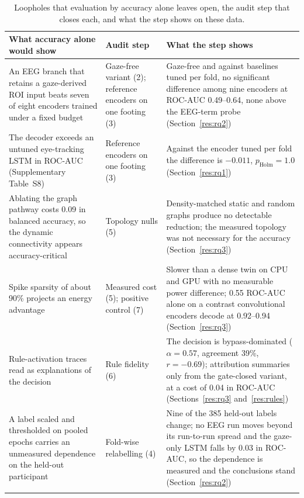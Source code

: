 \documentclass[pdflatex,sn-basic,Numbered,twocolumn,iicol]{sn-jnl}
\theoremstyle{thmstyleone}%
\theoremstyle{thmstyletwo}%
\theoremstyle{thmstylethree}%
\begin{document}
\begin{table}[!htbp]
\caption{Loopholes that evaluation by accuracy alone leaves open, the audit step that closes each, and what the step shows on these data.}\label{tab:loopholes}
\footnotesize
\begin{tabular*}{\textwidth}{@{\extracolsep{\fill}}p{}p{}p{}@{}}
\toprule
What accuracy alone would show & Audit step & What the step shows \\
\midrule
An EEG branch that retains a gaze-derived ROI input beats seven of eight encoders trained under a fixed budget & Gaze-free variant (2); reference encoders on one footing (3) & Gaze-free and against baselines tuned per fold, no significant difference among nine encoders at ROC-AUC 0.49--0.64, none above the EEG-term probe (Section~\ref{res:rq2}) \\
The decoder exceeds an untuned eye-tracking LSTM in ROC-AUC (Supplementary Table~S8) & Reference encoders on one footing (3) & Against the encoder tuned per fold the difference is $-0.011$, $p_{\mathrm{Holm}}=1.0$ (Section~\ref{res:rq1}) \\
Ablating the graph pathway costs 0.09 in balanced accuracy, so the dynamic connectivity appears accuracy-critical & Topology nulls (5) & Density-matched static and random graphs produce no detectable reduction; the measured topology was not necessary for the accuracy (Section~\ref{res:rq3}) \\
Spike sparsity of about 90\% projects an energy advantage & Measured cost (5); positive control (7) & Slower than a dense twin on CPU and GPU with no measurable power difference; 0.55 ROC-AUC alone on a contrast convolutional encoders decode at 0.92--0.94 (Section~\ref{res:rq3}) \\
Rule-activation traces read as explanations of the decision & Rule fidelity (6) & The decision is bypass-dominated ($\alpha=0.57$, agreement 39\%, $r=-0.69$); attribution summaries only from the gate-closed variant, at a cost of 0.04 in ROC-AUC (Sections~\ref{res:rq3} and~\ref{res:rules}) \\
A label scaled and thresholded on pooled epochs carries an unmeasured dependence on the held-out participant & Fold-wise relabelling (4) & Nine of the 385 held-out labels change; no EEG run moves beyond its run-to-run spread and the gaze-only LSTM falls by 0.03 in ROC-AUC, so the dependence is measured and the conclusions stand (Section~\ref{res:rq2}) \\
\botrule
\end{tabular*}
\end{table}
\end{document}
